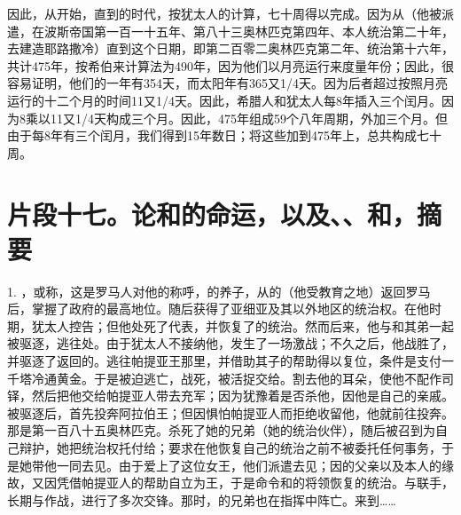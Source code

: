 因此，从开始，直到的时代，按犹太人的计算，七十周得以完成。因为从（他被派遣，在波斯帝国第一百一十五年、第八十三奥林匹克第四年、本人统治第二十年，去建造耶路撒冷）直到这个日期，即第二百零二奥林匹克第二年、统治第十六年，共计475年，按希伯来计算法为490年，因为他们以月亮运行来度量年份；因此，很容易证明，他们的一年有354天，而太阳年有365又1/4天。因为后者超过按照月亮运行的十二个月的时间11又1/4天。因此，希腊人和犹太人每8年插入三个闰月。因为8乘以11又1/4天构成三个月。因此，475年组成59个八年周期，外加三个月。但由于每8年有三个闰月，我们得到15年数日；将这些加到475年上，总共构成七十周。\par


\section{片段十七。论和的命运，以及、、和，摘要}

1. ，或称，这是罗马人对他的称呼，的养子，从的（他受教育之地）返回罗马后，掌握了政府的最高地位。随后获得了亚细亚及其以外地区的统治权。在他时期，犹太人控告；但他处死了代表，并恢复了的统治。然而后来，他与和其弟一起被驱逐，逃往处。由于犹太人不接纳他，发生了一场激战；不久之后，他战胜了，并驱逐了返回的。逃往帕提亚王那里，并借助其子的帮助得以复位，条件是支付一千塔冷通黄金。于是被迫逃亡，战死，被活捉交给。割去他的耳朵，使他不配作司铎，然后把他交给帕提亚人带去充军；因为犹豫着是否杀他，因他是自己的亲戚。被驱逐后，首先投奔阿拉伯王；但因惧怕帕提亚人而拒绝收留他，他就前往投奔。那是第一百八十五奥林匹克。杀死了她的兄弟（她的统治伙伴），随后被召到为自己辩护，她把统治权托付给；要求在他恢复自己的统治之前不被委托任何事务，于是她带他一同去见。由于爱上了这位女王，他们派遣去见；因的父亲以及本人的缘故，又因凭借帕提亚人的帮助自立为王，于是命令和的将领恢复的统治。与联手，长期与作战，进行了多次交锋。那时，的兄弟也在指挥中阵亡。来到……\par

